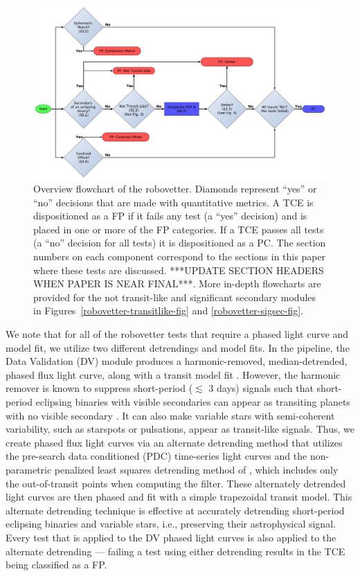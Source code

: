 \begin{figure}[ht]
\centering
\includegraphics[width=\linewidth]{RoboVetter-Diagram-V4-Overview.pdf}
\caption{Overview flowchart of the robovetter. Diamonds represent ``yes'' or ``no'' decisions that are made with quantitative metrics. A TCE is dispositioned as a FP if it fails any test (a ``yes'' decision) and is placed in one or more of the FP categories. If a TCE passes all tests (a ``no'' decision for all tests) it is dispositioned as a PC. The section numbers on each component correspond to the sections in this paper where these tests are discussed. ***UPDATE SECTION HEADERS WHEN PAPER IS NEAR FINAL***. More in-depth flowcharts are provided for the not transit-like and significant secondary modules in Figures~\ref{robovetter-transitlike-fig} and \ref{robovetter-sigsec-fig}.}
\label{robovetter-overview-fig}
\end{figure}


We note that for all of the robovetter tests that require a phased light curve and model fit, we utilize two different detrendings and model fits. In the \kepler{} pipeline, the Data Validation (DV) module produces a harmonic-removed, median-detrended, phased flux light curve, along with a transit model fit \citep{Wu2010}. However, the harmonic remover is known to suppress short-period ($\lesssim$ 3 days) signals such that short-period eclipsing binaries with visible secondaries can appear as transiting planets with no visible secondary \citep{Christiansen2013b}. It can also make variable stars with semi-coherent variability, such as starspots or pulsations, appear as transit-like signals. Thus, we create phased flux light curves via an alternate detrending method that utilizes the pre-search data conditioned (PDC) time-series light curves and the non-parametric penalized least squares detrending method of \citet{Garcia2010}, which includes only the out-of-transit points when computing the filter. These alternately detrended light curves are then phased and fit with a simple trapezoidal transit model. This alternate detrending technique is effective at accurately detrending short-period eclipsing binaries and variable stars, i.e., preserving their astrophysical signal. Every test that is applied to the DV phased light curves is also applied to the alternate detrending --- failing a test using either detrending results in the TCE being classified as a FP.

